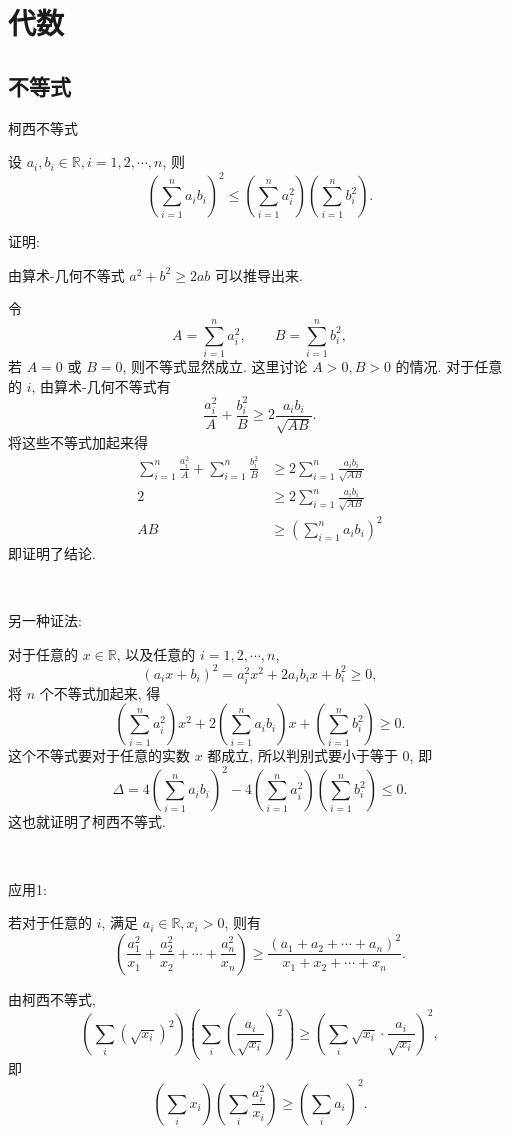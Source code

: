 \chapter{代数}

\section{不等式}

\noindent 柯西不等式

设 $a_i,b_i\in\mathbb{R}, i=1,2,\cdots,n$, 则
\[ \left(\sum_{i=1}^n{a_ib_i}\right)^2\le\left(\sum_{i=1}^na_i^2\right)\left(\sum_{i=1}^nb_i^2\right) .\]

\noindent 证明:

由算术-几何不等式 $a^2+b^2 \ge 2ab$ 可以推导出来.

令 
\[A = \sum_{i=1}^na_i^2, \qquad B = \sum_{i=1}^nb_i^2, \]
若 $A = 0$ 或 $B = 0$, 则不等式显然成立. 这里讨论 $A > 0, B > 0$ 的情况. 对于任意的 $i$, 由算术-几何不等式有
\[\frac{a_i^2}{A} + \frac{b_i^2}{B} \ge 2\frac{a_ib_i}{\sqrt{AB}} .\]
将这些不等式加起来得
\begin{align*}
\sum_{i=1}^n\frac{a_i^2}{A} + \sum_{i=1}^n\frac{b_i^2}{B} &\ge 2\sum_{i=1}^n\frac{a_ib_i}{\sqrt{AB}}\\
2 &\ge 2 \sum_{i=1}^n\frac{a_ib_i}{\sqrt{AB}}\\
AB &\ge \left(\sum_{i=1}^na_ib_i\right)^2
\end{align*}
即证明了结论.

~

\noindent 另一种证法:

对于任意的 $x\in\mathbb{R}$, 以及任意的 $i=1,2,\cdots,n$, 
\[ (a_ix+b_i)^2 = a_i^2x^2+2a_ib_ix+b_i^2 \ge 0 ,\] 
将 $n$ 个不等式加起来, 得
\[\left( \sum_{i=1}^na_i^2 \right)x^2 + 2\left(\sum_{i=1}^na_ib_i\right)x + \left(\sum_{i=1}^nb_i^2\right) \ge 0.\]
这个不等式要对于任意的实数 $x$ 都成立, 所以判别式要小于等于 $0$, 即
\[ \Delta = 4\left(\sum_{i=1}^na_ib_i\right)^2 - 4\left( \sum_{i=1}^na_i^2 \right)\left( \sum_{i=1}^nb_i^2 \right) \le 0. \]
这也就证明了柯西不等式.

~

\noindent 应用1: 

若对于任意的 $i$, 满足 $a_i\in\mathbb{R}, x_i > 0$, 则有
\[\left( \frac{a_1^2}{x_1} + \frac{a_2^2}{x_2} + \cdots + \frac{a_n^2}{x_n} \right) \ge \frac{(a_1+a_2+\cdots+a_n)^2}{x_1+x_2+\cdots+x_n} .\]

由柯西不等式, 
\[\left( \sum_i(\sqrt{x_i})^2 \right)\left(\sum_i(\frac{a_i}{\sqrt{x_i}})^2\right) \ge \left(\sum_i \sqrt{x_i}\cdot\frac{a_i}{\sqrt{x_i}}\right)^2 ,\]
即
\[ \left(\sum_i x_i\right) \left(\sum_i\frac{a_i^2}{x_i}\right) \ge \left(\sum_ia_i\right)^2.\]

